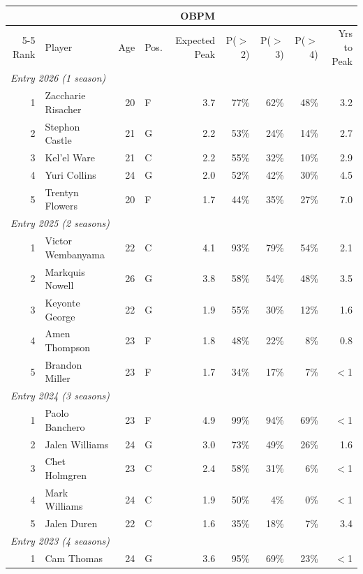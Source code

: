 \begin{table}[htbp]
  \centering\small
  \begin{tabular}{rlrlrrrrr}
    \toprule
     & & & & OBPM & & & & \\
    \cmidrule(lr){5-5}
    Rank & Player & Age & Pos. & Expected Peak & P($>$2) & P($>$3) & P($>$4) & Yrs to Peak \\
    \midrule
    \multicolumn{9}{l}{\textit{Entry 2026 (1 season)}} \\
    \midrule
    1 & Zaccharie Risacher & 20 & F & 3.7 & 77\% & 62\% & 48\% & 3.2 \\
    2 & Stephon Castle & 21 & G & 2.2 & 53\% & 24\% & 14\% & 2.7 \\
    3 & Kel'el Ware & 21 & C & 2.2 & 55\% & 32\% & 10\% & 2.9 \\
    4 & Yuri Collins & 24 & G & 2.0 & 52\% & 42\% & 30\% & 4.5 \\
    5 & Trentyn Flowers & 20 & F & 1.7 & 44\% & 35\% & 27\% & 7.0 \\
    \midrule[0.4pt]
    \multicolumn{9}{l}{\textit{Entry 2025 (2 seasons)}} \\
    \midrule
    1 & Victor Wembanyama & 22 & C & 4.1 & 93\% & 79\% & 54\% & 2.1 \\
    2 & Markquis Nowell & 26 & G & 3.8 & 58\% & 54\% & 48\% & 3.5 \\
    3 & Keyonte George & 22 & G & 1.9 & 55\% & 30\% & 12\% & 1.6 \\
    4 & Amen Thompson & 23 & F & 1.8 & 48\% & 22\% & 8\% & 0.8 \\
    5 & Brandon Miller & 23 & F & 1.7 & 34\% & 17\% & 7\% & $<$1 \\
    \midrule[0.4pt]
    \multicolumn{9}{l}{\textit{Entry 2024 (3 seasons)}} \\
    \midrule
    1 & Paolo Banchero & 23 & F & 4.9 & 99\% & 94\% & 69\% & $<$1 \\
    2 & Jalen Williams & 24 & G & 3.0 & 73\% & 49\% & 26\% & 1.6 \\
    3 & Chet Holmgren & 23 & C & 2.4 & 58\% & 31\% & 6\% & $<$1 \\
    4 & Mark Williams & 24 & C & 1.9 & 50\% & 4\% & 0\% & $<$1 \\
    5 & Jalen Duren & 22 & C & 1.6 & 35\% & 18\% & 7\% & 3.4 \\
    \midrule[0.4pt]
    \multicolumn{9}{l}{\textit{Entry 2023 (4 seasons)}} \\
    \midrule
    1 & Cam Thomas & 24 & G & 3.6 & 95\% & 69\% & 23\% & $<$1 \\

\end{tabular}
\end{table}
